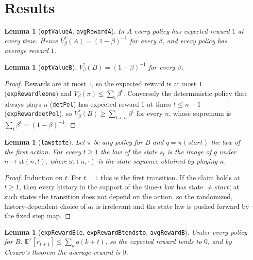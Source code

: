 \documentclass[11pt]{article}
\newtheorem{lemma}[theorem]{Lemma}
\theoremstyle{definition}
\theoremstyle{remark}
\renewcommand{\_}{\oldus\allowbreak}
\begin{document}
\section{Results}

\begin{lemma}[\texttt{optValue\_A}, \texttt{avgReward\_A}]
In $A$ every policy has expected reward $1$ at every time. Hence $V^*_\beta(A)=(1-\beta)^{-1}$ for
every $\beta$, and every policy has average reward $1$.
\end{lemma}

\begin{lemma}[\texttt{optValue\_B}]
$V^*_\beta(B)=(1-\beta)^{-1}$ for every $\beta$.
\end{lemma}

\begin{proof}
Rewards are at most $1$, so the expected reward is at most $1$ (\texttt{expReward\_le\_one}) and
$V_\beta(\pi)\le\sum_t\beta^t$. Conversely the deterministic policy that always plays $n$
(\texttt{detPol}) has expected reward $1$ at times $t\le n+1$ (\texttt{expReward\_detPol}), so
$V^*_\beta(B)\ge\sum_{t<n}\beta^t$ for every $n$, whose supremum is $\sum_t\beta^t=(1-\beta)^{-1}$.
\end{proof}

\begin{lemma}[\texttt{law\_state}]
Let $\pi$ be any policy for $B$ and $q=\pi(\mathit{start})$ the law of the first action. For every
$t\ge1$ the law of the state $s_t$ is the image of $q$ under $n\mapsto \mathrm{st}(n,t)$, where
$\mathrm{st}(n,\cdot)$ is the state sequence obtained by playing $n$.
\end{lemma}

\begin{proof}
Induction on $t$. For $t=1$ this is the first transition. If the claim holds at $t\ge1$, then every
history in the support of the time-$t$ law has state $\ne\mathit{start}$; at such states the
transition does not depend on the action, so the randomized, history-dependent choice of $a_t$ is
irrelevant and the state law is pushed forward by the fixed step map.
\end{proof}

\begin{lemma}[\texttt{expReward\_B\_le}, \texttt{expReward\_B\_tendsto}, \texttt{avgReward\_B}]
Under every policy for $B$: $\mathbb E^\pi[r_{t+1}]\le\sum_{k}q(k+t)$, so the expected reward
tends to $0$, and by Cesaro's theorem the average reward is $0$.
\end{lemma}
\end{document}
